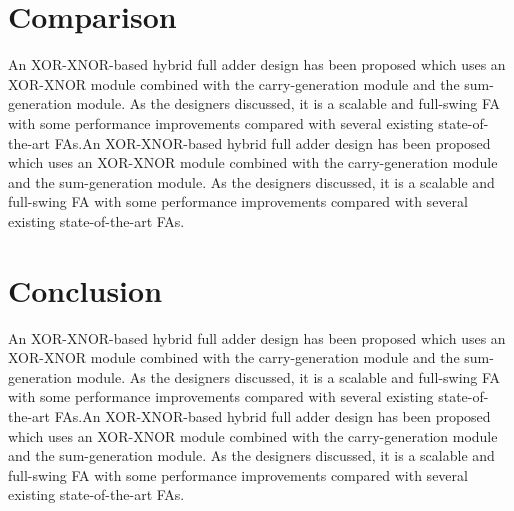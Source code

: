 \documentclass[conference]{IEEEtran}
\begin{document}
\section{Comparison}

An XOR-XNOR-based hybrid full adder design has been proposed\cite{20212210429416}
which uses an XOR-XNOR module combined with the carry-generation module and the sum-generation module.
As the designers discussed, it is a scalable and full-swing FA
with some performance improvements compared with several existing state-of-the-art FAs.An XOR-XNOR-based hybrid full adder design has been proposed\cite{20212210429416}
which uses an XOR-XNOR module combined with the carry-generation module and the sum-generation module.
As the designers discussed, it is a scalable and full-swing FA
with some performance improvements compared with several existing state-of-the-art FAs.

\section{Conclusion}

An XOR-XNOR-based hybrid full adder design has been proposed\cite{20212210429416}
which uses an XOR-XNOR module combined with the carry-generation module and the sum-generation module.
As the designers discussed, it is a scalable and full-swing FA
with some performance improvements compared with several existing state-of-the-art FAs.An XOR-XNOR-based hybrid full adder design has been proposed\cite{20212210429416}
which uses an XOR-XNOR module combined with the carry-generation module and the sum-generation module.
As the designers discussed, it is a scalable and full-swing FA
with some performance improvements compared with several existing state-of-the-art FAs.



\end{document}
